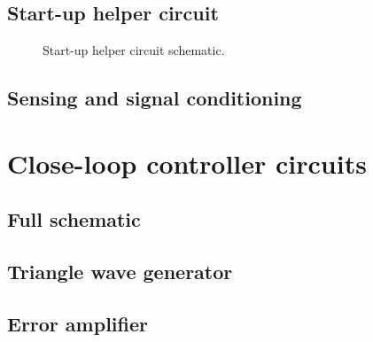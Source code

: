 

%

\subsection{Start-up helper circuit}
\begin{figure}[!h]
\centering

\caption[Start-up helper schematic]{Start-up helper circuit schematic.}
\label{fig:pwr_train_sch}
\end{figure}


\subsection{Sensing and signal conditioning}

\section{Close-loop controller circuits}
\subsection{Full schematic}
\subsection{Triangle wave generator}
\subsection{Error amplifier}






